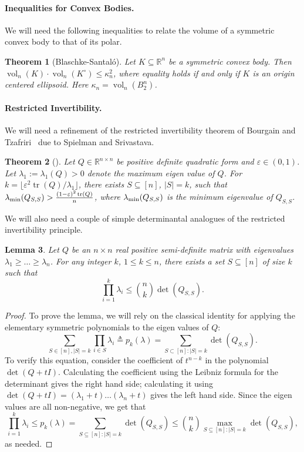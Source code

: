 \documentclass[11pt]{article}
\newtheorem{theorem}{Theorem}
\newtheorem{lemma}[theorem]{Lemma}
\newcommand{\floor}[1]{\lfloor #1 \rfloor}
\newcommand{\R}{{\mathbb{R}}}
\newcommand\eps{\varepsilon}
\newcommand{\eqdef}{\triangleq}
\DeclareMathOperator{\vol}{vol}
\DeclareMathOperator{\tr}{tr}
\begin{document}
\paragraph{\bf Inequalities for Convex Bodies.} We will need the following
inequalities to relate the volume of a symmetric convex body to that of its
polar.

\begin{theorem}[Blaschke-Santal{\'o}]\label{thm:santalo} 
Let $K \subseteq \R^n$ be a symmetric convex body. Then $\vol_n(K)\cdot
\vol_n(K^\circ) \leq \kappa_n^2$, where equality holds if and only if $K$ is
an origin centered ellipsoid. Here $\kappa_n = \vol_n(B_2^n)$.
\end{theorem}

\paragraph{\bf Restricted Invertibility.}

We will need a refinement of the restricted invertibility theorem of Bourgain
and Tzafriri~\cite{bour-tza} due to Spielman and Srivastava.

\begin{theorem}[\cite{bt-constructive}]\label{thm:rest-inv}
Let $Q \in \R^{n \times n}$ be positive definite quadratic form and $\eps \in
(0,1)$. Let $\lambda_1 := \lambda_1(Q) > 0$ denote the maximum eigen value of
$Q$.  For $k = \floor{\eps^2 \tr(Q)/\lambda_1}$, there exists $S \subseteq [n]$,
$|S|=k$, such that $\lambda_{\rm min}(Q_{S,S}) > \frac{(1-\eps)^2\tr(Q)}{n}$,
where $\lambda_{\rm min}(Q_{S,S})$ is the minimum eigenvalue of $Q_{S,S}$.
\end{theorem}

We will also need a couple of simple determinantal analogues of the restricted
invertibility principle.

\begin{lemma}\label{lm:rip-det}
  Let $Q$ be an $n\times n$ real positive semi-definite matrix with
  eigenvalues $\lambda_1 \ge \ldots \ge \lambda_n$. For any integer
  $k$, $1 \le k \le n$, there exists a set $S \subseteq [n]$ of size $k$
  such that
  \[\prod_{i=1}^k \lambda_i \leq \binom{n}{k} \det(Q_{S,S}).\]
\end{lemma}
\begin{proof}
To prove the lemma, we will rely on the classical identity for applying the
elementary symmetric polynomials to the eigen values of $Q$:
\begin{equation*}
\sum_{S \in [n],|S|=k} \prod_{i \in S} \lambda_i \eqdef p_k(\lambda) = \sum_{S \subset [n]: |S| = k}\det(Q_{S,S}).
\end{equation*}
To verify this equation, consider the coefficient of $t^{n-k}$ in the polynomial
$\det(Q + tI)$. Calculating the coefficient using the Leibniz formula for the
determinant gives the right hand side; calculating it using $\det(Q + tI) =
(\lambda_1 + t)\ldots(\lambda_n + t)$ gives the left hand side. Since the eigen
values are all non-negative, we get that
\[
\prod_{i=1}^k \lambda_i \leq p_k(\lambda) =  
 \sum_{S \subseteq [n]: |S|=k} \det(Q_{S,S}) \leq \binom{n}{k} \max_{S
\subseteq [n]: |S|=k} \det(Q_{S,S}),
\]
as needed.
\end{proof}
\end{document}
